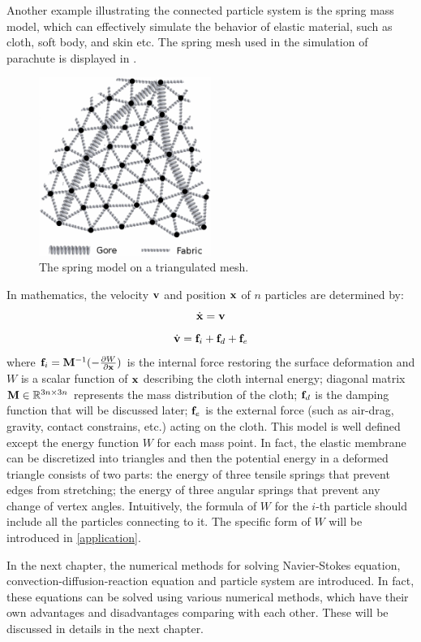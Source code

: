 Another example illustrating the connected particle system is the spring mass model, which can effectively simulate the behavior of elastic material, such as cloth\cite{}, soft body\cite{}, and skin\cite{} etc. The spring mesh used in the simulation of parachute is displayed in . 
\begin{figure}
\centering
\includegraphics[width=0.5\textwidth]{Figures/goremesh} 
\caption{The spring model on a triangulated mesh.} 
\label{fig:goremesh}
\end{figure}
In mathematics, the velocity $\mathbf{v}$ and position $\mathbf{x}$ of $n$ particles are determined by:
\begin{equation}
\dot{\mathbf{x}} = \mathbf{v}
\label{spring_x_eqn}
\end{equation}
\begin{equation}
\dot{\mathbf{v}} = \mathbf{f}_i
				+ \mathbf{f}_d + \mathbf{f}_e \label{spring_v_eqn}
\end{equation}
where $\mathbf{f}_i = \mathbf{M}^{-1}(-\frac{\partial W}{\partial \mathbf{x}})$ is the internal force restoring the surface deformation and $W$ is a scalar function of $\mathbf{x}$ describing the cloth internal energy; diagonal matrix $\mathbf{M} \in \mathbb{R}^{3n\times 3n}$ represents the mass distribution of the cloth; $\mathbf{f}_d$ is the damping function that will be discussed later; $\mathbf{f}_e$ is the external force (such as air-drag, gravity, contact constrains, etc.) acting on the cloth. This model is well defined except the energy function $W$ for each mass point. In fact, the elastic membrane can be discretized into triangles and then the potential energy in a deformed triangle consists of two parts: the energy of three tensile springs that prevent edges from stretching; the energy of three angular springs that prevent any change of vertex angles. Intuitively, the formula of $W$ for the $i$-th particle should include all the particles connecting to it. The specific form of $W$ will be introduced in \ref{application}.

In the next chapter, the numerical methods for solving Navier-Stokes equation, convection-diffusion-reaction equation and particle system are introduced. In fact, these equations can be solved using various numerical methods, which have their own advantages and disadvantages comparing with each other. These will be discussed in details in the next chapter.
